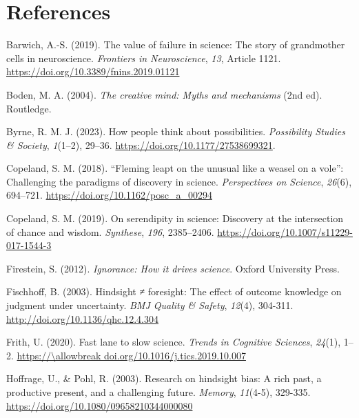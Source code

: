 \documentclass[authordate, commentary]{jote-new-article}
\begin{document}
  





	\section{References}







	Barwich, A.-S. (2019). The value of failure in science: The story of grandmother cells in neuroscience. \emph{Frontiers in Neuroscience}, \emph{13}, Article 1121. \url{https://doi.org/10.3389/fnins.2019.01121}



	Boden, M. A. (2004). \emph{The creative mind: Myths and mechanisms} (2nd ed). Routledge.



	Byrne, R. M. J. (2023). How people think about possibilities. \emph{Possibility Studies \& Society}, \emph{1}(1--2), 29--36. \url{https://doi.org/10.1177/27538699321}.



	Copeland, S. M. (2018). “Fleming leapt on the unusual like a weasel on a vole”: Challenging the paradigms of discovery in science. \emph{Perspectives on Science}, \emph{26}(6), 694--721. \url{https://doi.org/10.1162/posc\_a\_00294}



	Copeland, S. M. (2019). On serendipity in science: Discovery at the intersection of chance and wisdom. \emph{Synthese}, \emph{196}, 2385--2406. \url{https://doi.org/10.1007/s11229-017-1544-3}



	Firestein, S. (2012). \emph{Ignorance: How it drives science}. Oxford University Press.



	Fischhoff, B. (2003). Hindsight ≠ foresight: The effect of outcome knowledge on judgment under uncertainty. \emph{BMJ Quality \& Safety}, \emph{12}(4), 304-311. \url{http://doi.org/10.1136/qhc.12.4.304}
	
	Frith, U. (2020). Fast lane to slow science. \emph{Trends in Cognitive Sciences}, \emph{24}(1), 1--2. \url{https://\allowbreak doi.org/10.1016/j.tics.2019.10.007}



	Hoffrage, U., \& Pohl, R. (2003). Research on hindsight bias: A rich past, a productive present, and a challenging future. \emph{Memory}, \emph{11}(4-5), 329-335. \url{https://doi.org/10.1080/09658210344000080}
\end{document}
